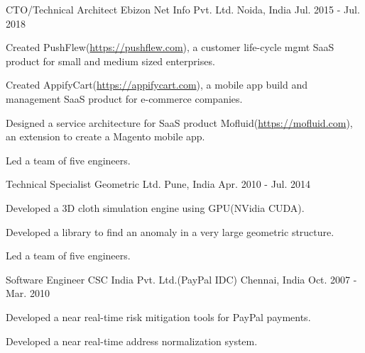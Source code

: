 \begin{cventries}
  \cventry
    {CTO/Technical Architect} %
    {Ebizon Net Info Pvt. Ltd.} %
    {Noida, India} %
    {Jul. 2015 - Jul. 2018} %
    {
      \begin{cvitems} %
        \item {Created PushFlew(\href{https://pushflew.com}{https://pushflew.com}), a customer life-cycle mgmt SaaS product for small and medium sized enterprises.}
        \item {Created AppifyCart(\href{https://appifycart.com}{https://appifycart.com}), a mobile app build and management SaaS product for e-commerce companies.}
        \item {Designed a service architecture for SaaS product Mofluid(\href{https://mofluid.com}{https://mofluid.com}), an extension to create a Magento mobile app.}
        \item {Led a team of five engineers.}
      \end{cvitems}
    }

  \cventry
    {Technical Specialist} %
    {Geometric Ltd.} %
    {Pune, India} %
    {Apr. 2010 - Jul. 2014} %
    {
      \begin{cvitems} %
        \item {Developed a 3D cloth simulation engine using GPU(NVidia CUDA).}
        \item {Developed a library to find an anomaly in a very large geometric structure.}
        \item {Led a team of five engineers.}
      \end{cvitems}
    }

  \cventry
    {Software Engineer} %
    {CSC India Pvt. Ltd.(PayPal IDC)} %
    {Chennai, India} %
    {Oct. 2007 - Mar. 2010} %
    {
      \begin{cvitems} %
        \item {Developed a near real-time risk mitigation tools for PayPal payments.}
        \item {Developed a near real-time address normalization system.}
      \end{cvitems}
    }


\end{cventries}
